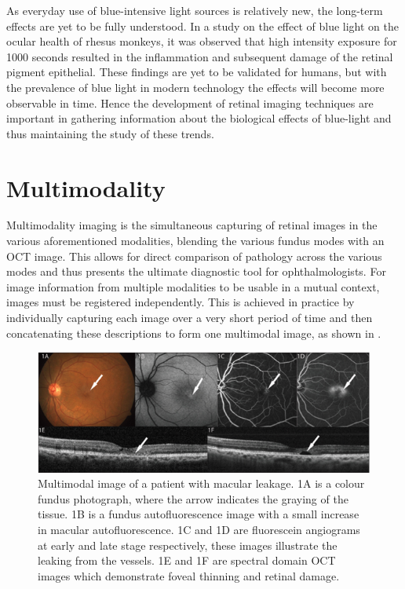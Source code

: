 As everyday use of blue-intensive light sources is relatively new, the long-term effects are
yet to be fully understood. In a study on the effect of blue light on the ocular health of
rhesus monkeys, it was observed that high intensity exposure for 1000 seconds resulted
in the inflammation and subsequent damage of the retinal pigment epithelial. \cite{ham1980nature}
These findings are yet to be validated for humans, but with the prevalence of blue light in
modern technology the effects will become more observable in time.
Hence the development of retinal imaging techniques are important in gathering information
about the biological effects of blue-light and thus maintaining the study of these trends.

\section{Multimodality}

Multimodality imaging is the simultaneous capturing of retinal images in the various
aforementioned modalities, blending the various fundus modes with an OCT image. This
allows for direct comparison of pathology across the various modes and thus presents
the ultimate diagnostic tool for ophthalmologists. For image information from multiple
modalities to be usable in a mutual context, images must be registered independently.
This is achieved in practice by individually capturing each image over a very short
period of time and then concatenating these descriptions to form one multimodal image,
as shown in . 

\begin{figure}[htbp]
\centering
 \includegraphics{figures/multitwo}
\caption{Multimodal image of a patient with macular leakage. 1A is a colour fundus
photograph, where the arrow indicates the graying of the tissue. 1B is a fundus
autofluorescence image with a small increase in macular autofluorescence. 1C and 1D
are fluorescein angiograms at early and late stage respectively, these images illustrate
the leaking from the vessels. 1E and 1F are spectral domain OCT images which demonstrate
foveal thinning and retinal damage.}
\label{fig:mt}
\end{figure}

